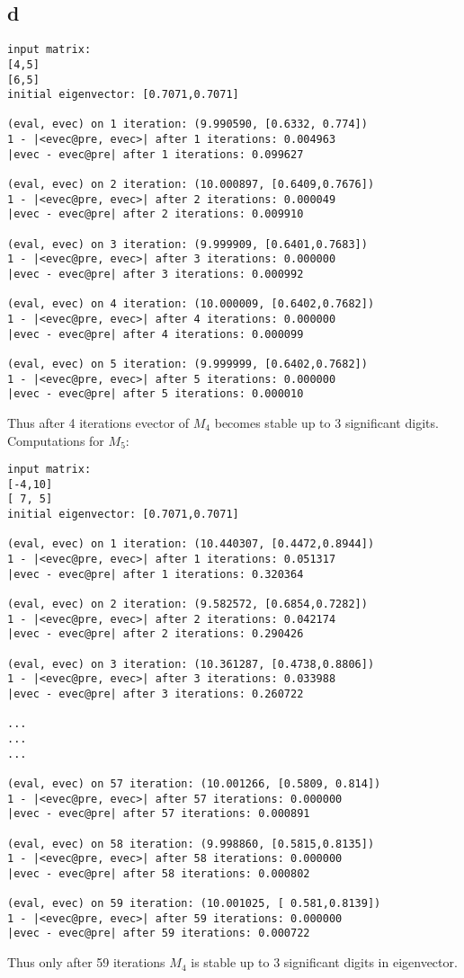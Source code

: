\subsection*{d}
\begin{verbatim}
input matrix:
[4,5]
[6,5]
initial eigenvector: [0.7071,0.7071]

(eval, evec) on 1 iteration: (9.990590, [0.6332, 0.774])
1 - |<evec@pre, evec>| after 1 iterations: 0.004963
|evec - evec@pre| after 1 iterations: 0.099627

(eval, evec) on 2 iteration: (10.000897, [0.6409,0.7676])
1 - |<evec@pre, evec>| after 2 iterations: 0.000049
|evec - evec@pre| after 2 iterations: 0.009910

(eval, evec) on 3 iteration: (9.999909, [0.6401,0.7683])
1 - |<evec@pre, evec>| after 3 iterations: 0.000000
|evec - evec@pre| after 3 iterations: 0.000992

(eval, evec) on 4 iteration: (10.000009, [0.6402,0.7682])
1 - |<evec@pre, evec>| after 4 iterations: 0.000000
|evec - evec@pre| after 4 iterations: 0.000099

(eval, evec) on 5 iteration: (9.999999, [0.6402,0.7682])
1 - |<evec@pre, evec>| after 5 iterations: 0.000000
|evec - evec@pre| after 5 iterations: 0.000010
\end{verbatim}
Thus after 4 iterations evector of $M_4$ becomes stable up to 3 significant digits.
Computations for $M_5$:
\begin{verbatim}
input matrix:
[-4,10]
[ 7, 5]
initial eigenvector: [0.7071,0.7071]

(eval, evec) on 1 iteration: (10.440307, [0.4472,0.8944])
1 - |<evec@pre, evec>| after 1 iterations: 0.051317
|evec - evec@pre| after 1 iterations: 0.320364

(eval, evec) on 2 iteration: (9.582572, [0.6854,0.7282])
1 - |<evec@pre, evec>| after 2 iterations: 0.042174
|evec - evec@pre| after 2 iterations: 0.290426

(eval, evec) on 3 iteration: (10.361287, [0.4738,0.8806])
1 - |<evec@pre, evec>| after 3 iterations: 0.033988
|evec - evec@pre| after 3 iterations: 0.260722

...
...
...

(eval, evec) on 57 iteration: (10.001266, [0.5809, 0.814])
1 - |<evec@pre, evec>| after 57 iterations: 0.000000
|evec - evec@pre| after 57 iterations: 0.000891

(eval, evec) on 58 iteration: (9.998860, [0.5815,0.8135])
1 - |<evec@pre, evec>| after 58 iterations: 0.000000
|evec - evec@pre| after 58 iterations: 0.000802

(eval, evec) on 59 iteration: (10.001025, [ 0.581,0.8139])
1 - |<evec@pre, evec>| after 59 iterations: 0.000000
|evec - evec@pre| after 59 iterations: 0.000722

\end{verbatim}
Thus only after 59 iterations $M_4$ is stable up to 3 significant digits in eigenvector.